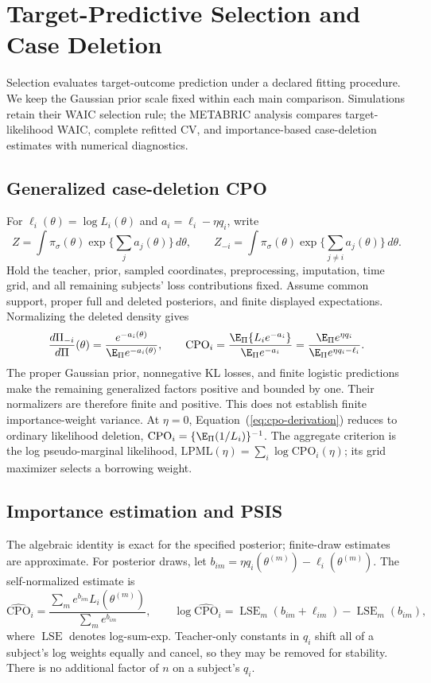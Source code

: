 \documentclass{article} %
\renewcommand{\eqref}[1]{\textup{(\ref{#1})}}
\begin{document}
\section{Target-Predictive Selection and Case Deletion}
\label{app:eta-algorithms}
Selection evaluates target-outcome prediction under a declared fitting procedure. We keep the Gaussian prior scale fixed within each main comparison. Simulations retain their WAIC selection rule; the METABRIC analysis compares target-likelihood WAIC, complete refitted CV, and importance-based case-deletion estimates with numerical diagnostics.

\subsection{Generalized case-deletion CPO}
For $\ell_i(\theta)=\log L_i(\theta)$ and $a_i=\ell_i-\eta q_i$, write
\[
Z=\int\pi_\sigma(\theta)\exp\{\textstyle\sum_j a_j(\theta)\}\,d\theta,
\qquad
Z_{-i}=\int\pi_\sigma(\theta)\exp\{\textstyle\sum_{j\ne i}a_j(\theta)\}\,d\theta.
\]
Hold the teacher, prior, sampled coordinates, preprocessing, imputation, time grid, and all remaining subjects' loss contributions fixed. Assume common support, proper full and deleted posteriors, and finite displayed expectations. Normalizing the deleted density gives
\begin{equation}
\frac{d\Pi_{-i}}{d\Pi}(\theta)
=\frac{e^{-a_i(\theta)}}{\E_\Pi e^{-a_i(\theta)}},\qquad
\mathrm{CPO}_i=\frac{\E_\Pi\{L_i e^{-a_i}\}}{\E_\Pi e^{-a_i}}
=\frac{\E_\Pi e^{\eta q_i}}{\E_\Pi e^{\eta q_i-\ell_i}}.
\label{eq:cpo-derivation}
\end{equation}
The proper Gaussian prior, nonnegative KL losses, and finite logistic predictions make the remaining generalized factors positive and bounded by one. Their normalizers are therefore finite and positive. This does not establish finite importance-weight variance. At $\eta=0$, Equation~\eqref{eq:cpo-derivation} reduces to ordinary likelihood deletion, $\mathrm{CPO}_i=\{\E_\Pi(1/L_i)\}^{-1}$. The aggregate criterion is the log pseudo-marginal likelihood, $\mathrm{LPML}(\eta)=\sum_i\log\mathrm{CPO}_i(\eta)$; its grid maximizer selects a borrowing weight.

\subsection{Importance estimation and PSIS}
The algebraic identity is exact for the specified posterior; finite-draw estimates are approximate. For posterior draws, let $b_{im}=\eta q_i(\theta^{(m)})-\ell_i(\theta^{(m)})$. The self-normalized estimate is
\begin{equation}
\widehat{\mathrm{CPO}}_i
=\frac{\sum_m e^{b_{im}}L_i(\theta^{(m)})}{\sum_m e^{b_{im}}},\qquad
\log\widehat{\mathrm{CPO}}_i
=\operatorname{LSE}_m(b_{im}+\ell_{im})-\operatorname{LSE}_m(b_{im}),
\label{eq:cpo-estimate}
\end{equation}
where $\operatorname{LSE}$ denotes log-sum-exp. Teacher-only constants in $q_i$ shift all of a subject's log weights equally and cancel, so they may be removed for stability. There is no additional factor of $n$ on a subject's $q_i$.
\end{document}
